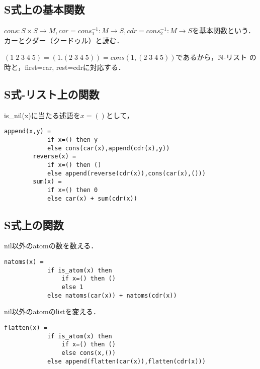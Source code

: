 \documentclass[uplatex, 12pt, dvipdfmx]{jsreport}
\begin{document}
\subsection{S式上の基本関数}

\begin{definition}
    $cons:S\times S\to M, car=cons_1^{-1}:M\to S, cdr=cons_2^{-1}:M\to S$を基本関数という．カーとクダー（クードゥル）と読む．
\end{definition}
\begin{remark}
    $(1\;2\;3\;4\;5)=(1.(2\;3\;4\;5))=cons(1,(2\;3\;4\;5))$であるから，$\mathbb{N}$-リスト
    の時と，first=car, rest=cdrに対応する．
\end{remark}

\subsection{S式-リスト上の関数}

\begin{example}
    is\_nil(x)に当たる述語を$x=()$として，
    \begin{lstlisting}[caption=append]
        append(x,y) =
            if x=() then y
            else cons(car(x),append(cdr(x),y))
        reverse(x) =
            if x=() then ()
            else append(reverse(cdr(x)),cons(car(x),()))
        sum(x) =
            if x=() then 0
            else car(x) + sum(cdr(x))
    \end{lstlisting}
\end{example}

\subsection{S式上の関数}

\begin{example}[アトムの数]
    nil以外のatomの数を数える．
    \begin{lstlisting}[caption=natoms]
        natoms(x) =
            if is_atom(x) then
                if x=() then ()
                else 1
            else natoms(car(x)) + natoms(cdr(x))
    \end{lstlisting}
\end{example}

\begin{example}[flatten]
    nil以外のatomのlistを変える．
    \begin{lstlisting}[caption=flatten]
        flatten(x) =
            if is_atom(x) then
                if x=() then ()
                else cons(x,())
            else append(flatten(car(x)),flatten(cdr(x)))
    \end{lstlisting}
\end{example}
\end{document}
